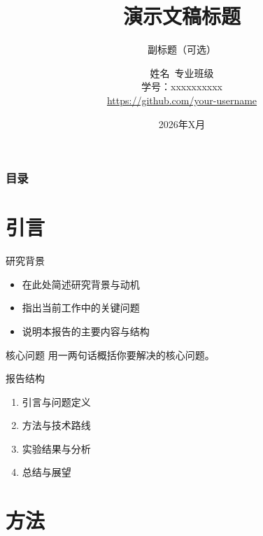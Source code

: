 \documentclass[10pt,aspectratio=169,mathserif]{beamer}
\title{演示文稿标题}
\subtitle{副标题（可选）}
\author[姓名]{
    姓名\ 专业班级\\
    学号：xxxxxxxxxx\\
    {\small \url{https://github.com/your-username}}
}
\date{2026年X月}
\begin{document}
\begin{frame}
    \titlepage
\end{frame}

\begin{frame}
    \frametitle{目录}
    \tableofcontents
\end{frame}

\section{引言}

\begin{frame}{研究背景}
    \begin{itemize}
        \item 在此处简述研究背景与动机
        \item 指出当前工作中的关键问题
        \item 说明本报告的主要内容与结构
    \end{itemize}

    \vspace{0.5cm}
    \begin{block}{核心问题}
        用一两句话概括你要解决的核心问题。
    \end{block}
\end{frame}

\begin{frame}{报告结构}
    \begin{enumerate}
        \item 引言与问题定义
        \item 方法与技术路线
        \item 实验结果与分析
        \item 总结与展望
    \end{enumerate}
\end{frame}

\section{方法}
\end{document}
